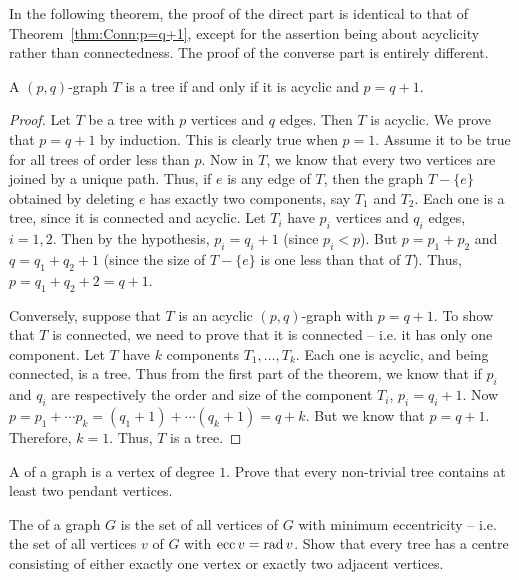 In the following theorem, the proof of the direct part is identical to that of Theorem~\ref{thm:Conn;p=q+1}, except for the assertion being about acyclicity rather than connectedness. The proof of the converse part is entirely different.
\begin{Theorem}\label{thm:Acyc;p=q+1}
A $(p,q)$-graph $T$ is a tree if and only if it is acyclic and $p = q + 1$.
\end{Theorem}
\begin{proof}
Let $T$ be a tree with $p$ vertices and $q$ edges. Then $T$ is acyclic. We prove that $p = q + 1$ by induction. This is clearly true when $p = 1$. Assume it to be true for all trees of order less than $p$. Now in $T$, we know that every two vertices are joined by a unique path. Thus, if $e$ is any edge of $T$, then the graph $T - \{e\}$ obtained by deleting $e$ has exactly two components, say $T_1$ and $T_2$. Each one is a tree, since it is connected and acyclic. Let $T_i$ have $p_i$ vertices and $q_i$ edges, $i = 1, 2$. Then by the hypothesis, $p_i = q_i + 1$ (since $p_i < p$). But $p = p_1 + p_2$ and $q = q_1 + q_2 + 1$ (since the size of $T - \{e\}$ is one less than that of $T$). Thus, $p = q_1 + q_2 + 2 = q + 1$.

Conversely, suppose that $T$ is an acyclic $(p,q)$-graph with $p = q + 1$. To show that $T$ is connected, we need to prove that it is connected -- i.e. it has only one component. Let $T$ have $k$ components $T_1, \ldots, T_k$. Each one is acyclic, and being connected, is a tree. Thus from the first part of the theorem, we know that if $p_i$ and $q_i$ are respectively the order and size of the component $T_i$, $p_i = q_i + 1$. Now $p = p_1 + \cdots p_k = (q_1 + 1) + \cdots (q_k + 1) = q + k$. But we know that $p = q + 1$. Therefore, $k = 1$. Thus, $T$ is a tree.
\end{proof}

\begin{Exercise}
A  of a graph is a vertex of degree $1$. Prove that every non-trivial tree contains at least two pendant vertices.\\
\end{Exercise}

\begin{Exercise}
The  of a graph $G$ is the set of all vertices of $G$ with minimum eccentricity -- i.e. the set of all vertices $v$ of $G$ with $\operatorname{ecc} v = \operatorname{rad} v$. Show that every tree has a centre consisting of either exactly one vertex or exactly two adjacent vertices.\\
\end{Exercise}

